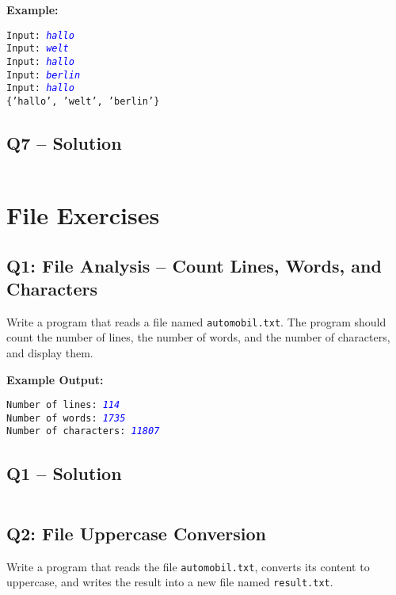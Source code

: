 \documentclass[a4paper,11pt]{article}
\begin{document}
\textbf{Example:}
\begin{flushleft}
	\texttt{Input: \textcolor{blue}{\textit{hallo}}}\\
	\texttt{Input: \textcolor{blue}{\textit{welt}}}\\
	\texttt{Input: \textcolor{blue}{\textit{hallo}}}\\
	\texttt{Input: \textcolor{blue}{\textit{berlin}}}\\
	\texttt{Input: \textcolor{blue}{\textit{hallo}}}\\
	\texttt{\{'hallo', 'welt', 'berlin'\}}
\end{flushleft}

\subsection*{Q7 – Solution}
\inputminted{python}{Files/11/7.py}

\newpage
\section{File Exercises}

\subsection*{Q1: File Analysis – Count Lines, Words, and Characters}
Write a program that reads a file named \texttt{automobil.txt}. The program should count the number of lines, the number of words, and the number of characters, and display them.



\textbf{Example Output:}
\begin{flushleft}
	\texttt{Number of lines: \textcolor{blue}{\textit{114}}}\\
	\texttt{Number of words: \textcolor{blue}{\textit{1735}}}\\
	\texttt{Number of characters: \textcolor{blue}{\textit{11807}}}
\end{flushleft}


\subsection*{Q1 – Solution}
\inputminted{python}{Files/12/1.py}

\subsection*{Q2: File Uppercase Conversion}
Write a program that reads the file \texttt{automobil.txt}, converts its content to uppercase, and writes the result into a new file named \texttt{result.txt}.
\end{document}
